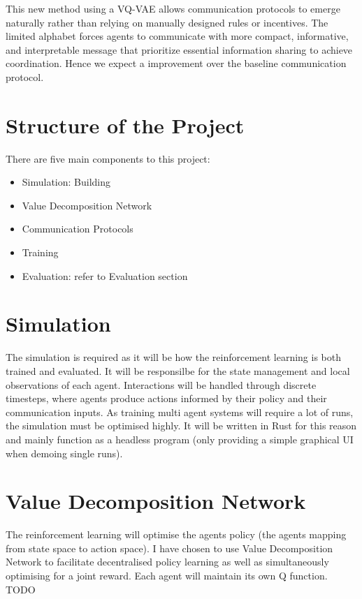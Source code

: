 \documentclass[20pt]{article}
\begin{document}
This new method using a VQ-VAE allows communication protocols to emerge naturally rather than relying on manually designed rules or incentives. The limited alphabet forces agents to communicate with more compact, informative, and interpretable message that prioritize essential information sharing to achieve coordination. Hence we expect a improvement over the baseline communication protocol.

\pagebreak
\section{Structure of the Project}
There are five main components to this project:

\begin{itemize}
\item Simulation: Building 
\item Value Decomposition Network
\item Communication Protocols
\item Training
\item Evaluation: refer to Evaluation section
\end{itemize}

\section*{Simulation}
The simulation is required as it will be how the reinforcement learning is both trained and evaluated. It will be responsilbe for the state management and local observations of each agent. Interactions will be handled through discrete timesteps, where agents produce actions informed by their policy and their communication inputs.  As training multi agent systems will require a lot of runs, the simulation must be optimised highly. It will be written in Rust for this reason and mainly function as a headless program (only providing a simple graphical UI when demoing single runs).

\section*{Value Decomposition Network}
The reinforcement learning will optimise the agents policy (the agents mapping from state space to action space). I have chosen to use Value Decomposition Network to facilitate decentralised policy learning as well as simultaneously optimising for a joint reward. Each agent will maintain its own Q function. TODO
\end{document}
